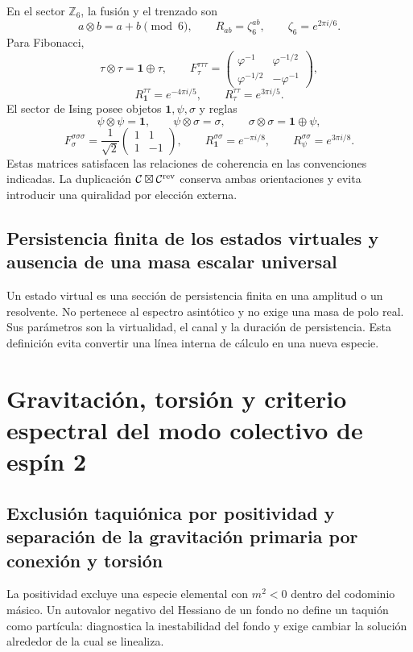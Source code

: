 En el sector \(\mathbb Z_6\), la fusión y el trenzado son
\[
 a\otimes b=a+b\pmod 6,
 \qquad
 R_{ab}=\zeta_6^{ab},
 \qquad \zeta_6=e^{2\pi i/6}.
\]
Para Fibonacci,
\[
 \tau\otimes\tau=\mathbf 1\oplus\tau,
 \qquad
 F_\tau^{\tau\tau\tau}=
 \begin{pmatrix}
 \varphi^{-1}&\varphi^{-1/2}\\
 \varphi^{-1/2}&-\varphi^{-1}
 \end{pmatrix},
\]
\[
 R_{\mathbf1}^{\tau\tau}=e^{-4\pi i/5},
 \qquad
 R_\tau^{\tau\tau}=e^{3\pi i/5}.
\]
El sector de Ising posee objetos \(\mathbf1,\psi,\sigma\) y reglas
\[
 \psi\otimes\psi=\mathbf1,
 \qquad
 \psi\otimes\sigma=\sigma,
 \qquad
 \sigma\otimes\sigma=\mathbf1\oplus\psi,
\]
\[
 F_\sigma^{\sigma\sigma\sigma}
 =\frac1{\sqrt2}
 \begin{pmatrix}1&1\\1&-1\end{pmatrix},
 \qquad
 R_{\mathbf1}^{\sigma\sigma}=e^{-\pi i/8},
 \qquad
 R_\psi^{\sigma\sigma}=e^{3\pi i/8}.
\]
Estas matrices satisfacen las relaciones de coherencia en las convenciones
indicadas. La duplicación
\(\mathcal C\boxtimes\mathcal C^{\rm rev}\) conserva ambas orientaciones y
evita introducir una quiralidad por elección externa.

\subsection{Persistencia finita de los estados virtuales y ausencia de una masa escalar universal}

Un estado virtual es una sección de persistencia finita en una amplitud o un
resolvente. No pertenece al espectro asintótico y no exige una masa de polo
real. Sus parámetros son la virtualidad, el canal y la duración de
persistencia. Esta definición evita convertir una línea interna de cálculo en
una nueva especie.

\section{Gravitación, torsión y criterio espectral del modo colectivo de espín 2}

\subsection{Exclusión taquiónica por positividad y separación de la gravitación primaria por conexión y torsión}

La positividad excluye una especie elemental con \(m^2<0\) dentro del
codominio másico. Un autovalor negativo del Hessiano de un fondo no define un
taquión como partícula: diagnostica la inestabilidad del fondo y exige cambiar
la solución alrededor de la cual se linealiza.

